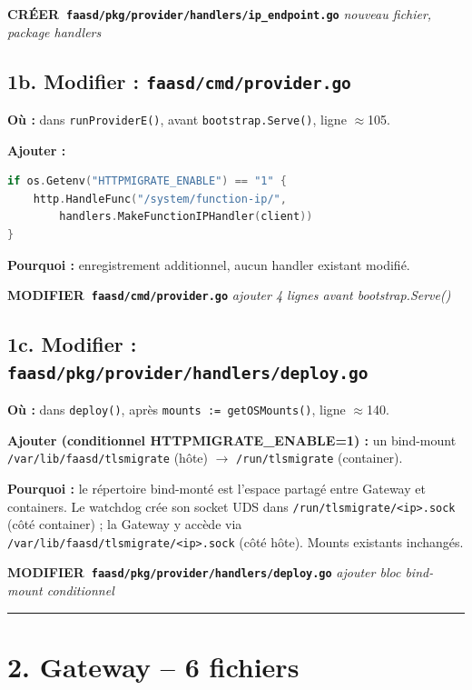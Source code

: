 \documentclass[11pt,a4paper]{article}
\newcommand{\act}[3]{%
  \vspace{0.2em}
  \noindent\colorbox{actionbg}{\parbox{\dimexpr\linewidth-2\fboxsep\relax}{%
    \small\textbf{#1~\texttt{#2}} \hfill \textit{\small #3}\\[-0.3em]
  }}
  \vspace{0.2em}
}
\begin{document}
\act{CRÉER}{faasd/pkg/provider/handlers/ip\_endpoint.go}{nouveau fichier, package handlers}

\subsection*{1b. Modifier : \texttt{faasd/cmd/provider.go}}

\textbf{Où :} dans \texttt{runProviderE()}, avant \texttt{bootstrap.Serve()}, ligne $\approx$105.

\textbf{Ajouter :}
\begin{lstlisting}[language=Go]
if os.Getenv("HTTPMIGRATE_ENABLE") == "1" {
    http.HandleFunc("/system/function-ip/",
        handlers.MakeFunctionIPHandler(client))
}
\end{lstlisting}

\textbf{Pourquoi :} enregistrement additionnel, aucun handler existant modifié.

\act{MODIFIER}{faasd/cmd/provider.go}{ajouter 4 lignes avant bootstrap.Serve()}

\subsection*{1c. Modifier : \texttt{faasd/pkg/provider/handlers/deploy.go}}

\textbf{Où :} dans \texttt{deploy()}, après \texttt{mounts := getOSMounts()}, ligne $\approx$140.

\textbf{Ajouter (conditionnel HTTPMIGRATE\_ENABLE=1) :} un bind-mount
\texttt{/var/lib/faasd/tlsmigrate} (hôte) $\to$ \texttt{/run/tlsmigrate} (container).

\textbf{Pourquoi :} le répertoire bind-monté est l'espace partagé entre Gateway et containers.
Le watchdog crée son socket UDS dans \texttt{/run/tlsmigrate/<ip>.sock} (côté container) ;
la Gateway y accède via \texttt{/var/lib/faasd/tlsmigrate/<ip>.sock} (côté hôte).
Mounts existants inchangés.

\act{MODIFIER}{faasd/pkg/provider/handlers/deploy.go}{ajouter bloc bind-mount conditionnel}

\bigskip\hrule\bigskip

\section*{2. Gateway -- 6 fichiers}
\end{document}

